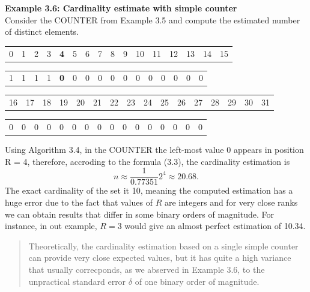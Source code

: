 \documentclass[a4paper,13pt]{article}
\theoremstyle{mytheor}
\begin{document}
\begin{mdframed}
    \vspace{0.25cm}
    \textbf{Example 3.6: Cardinality estimate with simple counter}\\
    Consider the COUNTER from Example 3.5 and compute the estimated
    number of distinct elements.
    \begin{center}
        \begin{tabular}{p{0.4cm}p{0.4cm}p{0.4cm}p{0.4cm}p{0.4cm}p{0.4cm}p{0.4cm}p{0.4cm}p{0.4cm}p{0.4cm}p{0.4cm}p{0.4cm}p{0.4cm}p{0.4cm}p{0.4cm}p{0.4cm}}
            0 & 1 & 2 & 3 & \textbf{4} & 5 & 6 & 7 & 8 & 9 & 10 & 11 & 12 & 13 & 14 & 15 %
        \end{tabular}
        \begin{tabular}{|p{0.4cm}|p{0.4cm}|p{0.4cm}|p{0.4cm}|p{0.4cm}|p{0.4cm}|p{0.4cm}|p{0.4cm}|p{0.4cm}|p{0.4cm}|p{0.4cm}|p{0.4cm}|p{0.4cm}|p{0.4cm}|p{0.4cm}|p{0.4cm}|}
            \hline
            1 & 1 & 1 & 1 & \textbf{0} & 0 & 0 & 0 & 0 & 0 & 0 & 0 & 0 & 0 & 0 & 0 \\ \cline{1-16} %
        \end{tabular}
        \begin{tabular}{p{0.4cm}p{0.4cm}p{0.4cm}p{0.4cm}p{0.4cm}p{0.4cm}p{0.4cm}p{0.4cm}p{0.4cm}p{0.4cm}p{0.4cm}p{0.4cm}p{0.4cm}p{0.4cm}p{0.4cm}p{0.4cm}}
            16 & 17 & 18 & 19 & 20 & 21 & 22 & 23 & 24 & 25 & 26 & 27 & 28 & 29 & 30 & 31 %
        \end{tabular}
        \begin{tabular}{|p{0.4cm}|p{0.4cm}|p{0.4cm}|p{0.4cm}|p{0.4cm}|p{0.4cm}|p{0.4cm}|p{0.4cm}|p{0.4cm}|p{0.4cm}|p{0.4cm}|p{0.4cm}|p{0.4cm}|p{0.4cm}|p{0.4cm}|p{0.4cm}|}
            \hline
            0 & 0 & 0 & 0 & 0 & 0 & 0 & 0 & 0 & 0 & 0 & 0 & 0 & 0 & 0 & 0 \\ \cline{1-16} %
        \end{tabular}
    \end{center}
    Using Algorithm 3.4, in the COUNTER the left-most value 0 appears in
    position R = 4, therefore, accroding to the formula (3.3), the cardinality
    estimation is
    \[
        n \approx \frac{1}{0.77351}2^4 \approx 20.68.
    \]
    The exact cardinality of the set it 10, meaning the computed estimation
    has a huge error due to the fact that values of $R$ are integers and for
    very close ranks we can obtain results that differ in some binary orders
    of magnitude. For instance, in out example, $R = 3$ would give an almost
    perfect estimation of 10.34.
    \vspace{0.25cm}
\end{mdframed}
\begin{quote}
    Theoretically, the cardinality estimation based on a single simple counter
    can provide very close expected values, but it has quite a high variance that
    usually correcponds, as we abserved in Example 3.6, to the unpractical
    standard error $\delta$ of one binary order of magnitude.
    \vspace{0.25cm}
\end{quote}
\\
\end{document}
